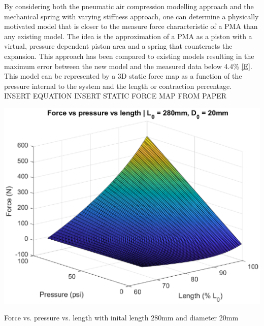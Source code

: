 \documentclass[11pt,a4paper]{article}
\begin{document}
By considering both the pneumatic air compression modelling approach and the mechanical spring with varying stiffness approach, one can determine a physically motivated model that is closer to the measure force characteristic of a PMA than any existing model. The idea is the approximation of a PMA as a piston with a virtual, pressure dependent piston area and a spring that counteracts the expansion. This approach has been compared to existing models resulting in the maximum error between the new model and the measured data below 4.4\% \ref{E}. This model can be represented by a 3D static force map as a function of the pressure internal to the system and the length or contraction percentage. 
\newline INSERT EQUATION
\newline INSERT STATIC FORCE MAP FROM PAPER
\begin{center}
    \includegraphics[scale=0.6]{staticmap.eps}
    \label{fig:StaticForce}
    \caption{Force vs. pressure vs. length with inital length 280mm and diameter 20mm}
\end{center}
\end{document}
